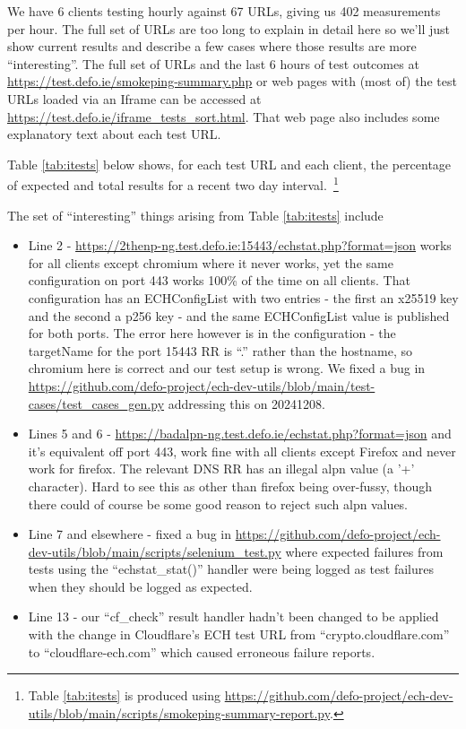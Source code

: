 We have 6 clients testing hourly against 67 URLs, giving us 402 measurements
per hour. The full set of URLs are too long to explain in detail here so
we'll just show current results and describe a few cases where those results
are more ``interesting''. The full set of URLs and the last 6 hours of test
outcomes at \url{https://test.defo.ie/smokeping-summary.php} or 
web pages with (most of) the test URLs loaded via an Iframe can be accessed at
\url{https://test.defo.ie/iframe_tests_sort.html}. That web page also includes
some explanatory text about each test URL.

Table \ref{tab:itests} below shows, for each test URL and each client,
the percentage of expected and total results for a recent two day
interval.~\footnote{Table \ref{tab:itests} is produced
using \url{https://github.com/defo-project/ech-dev-utils/blob/main/scripts/smokeping-summary-report.py}.}




The set of ``interesting'' things arising from Table \ref{tab:itests} include

\begin{itemize}
\item Line 2 - \url{https://2thenp-ng.test.defo.ie:15443/echstat.php?format=json} works for all
    clients except chromium where it never works, yet the same configuration on port 443 works
    100\% of the time on all clients. That configuration has an ECHConfigList with two
    entries - the first an x25519 key and the second a p256 key - and the same ECHConfigList 
    value is published for both ports. The error here however is in the configuration - the
    targetName for the port 15443 RR is ``.'' rather than the hostname, so chromium here
    is correct and our test setup is wrong. We fixed a bug in 
    \url{https://github.com/defo-project/ech-dev-utils/blob/main/test-cases/test_cases_gen.py}
        addressing this on 20241208.\\
\item Lines 5 and 6 - \url{https://badalpn-ng.test.defo.ie/echstat.php?format=json} and
    it's equivalent off port 443, work fine with all clients except Firefox and never work
    for firefox. The relevant DNS RR has an illegal alpn value (a '+' character). Hard to
    see this as other than firefox being over-fussy, though there could of course be some
    good reason to reject such alpn values.
\item Line 7 and elsewhere - fixed a bug in 
    \url{https://github.com/defo-project/ech-dev-utils/blob/main/scripts/selenium_test.py} where
        expected failures from tests using the ``echstat\_stat()'' handler were being logged as 
        test failures when they should be logged as expected.
    \item Line 13 - our ``cf\_check'' result handler hadn't been changed to be applied 
        with the change in Cloudflare's ECH test URL from ``crypto.cloudflare.com'' to
        ``cloudflare-ech.com'' which caused erroneous failure reports.
\end{itemize}

